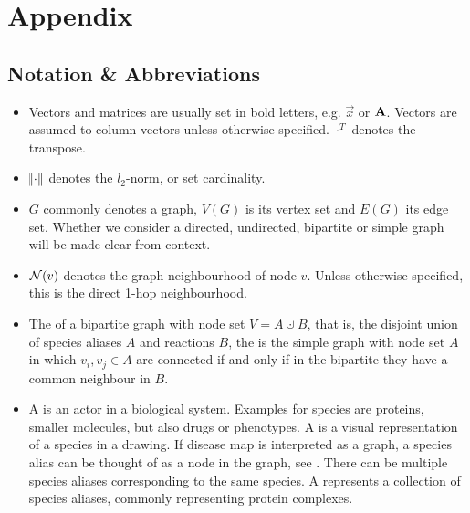 \documentclass[
	fontsize=10pt, %
	twoside=false, %
	secnumdepth=1, %
  toc=indentunnumbered %
]{kaobook}
\begin{document}









\pagebreak


\backmatter %

\appendix %



\chapter{Appendix}

\section{Notation \& Abbreviations  }
\begin{itemize}
\item Vectors and matrices are usually set in bold letters, e.g. $\vec x$ or
  $\mathbf{A}$. Vectors are assumed to column vectors unless otherwise specified.
  $\cdot^T$ denotes the transpose.
\item $\norm{\cdot}$ denotes the $l_2$-norm, or set cardinality.
\item $G$ commonly denotes a graph, $V(G)$ is its vertex set and $E(G)$ its edge
  set. Whether we consider a directed, undirected, bipartite or simple graph
  will be made clear from context.
\item $\mathcal{N}(v)$ denotes the graph neighbourhood of node $v$. Unless otherwise
  specified, this is the direct 1-hop neighbourhood.
\item The  of a bipartite graph with node set $V = A
  \cupdot B$, that is, the disjoint union of species aliases $A$ and reactions
  $B$, the  is the simple graph with node set
  $A$ in which $v_i, v_j \in A$ are connected if and only if in the bipartite
  they have a common neighbour in $B$.
\item A  is an actor in a biological system. Examples for species
  are proteins, smaller molecules, but also drugs or phenotypes. A  is a visual representation of a species in a drawing. If disease map
  is interpreted as a graph, a species alias can be thought of as a node in the
  graph, see . There can be multiple species
  aliases corresponding to the same species. A 
  represents a collection of species aliases, commonly representing protein
  complexes.
\end{itemize}
\end{document}
